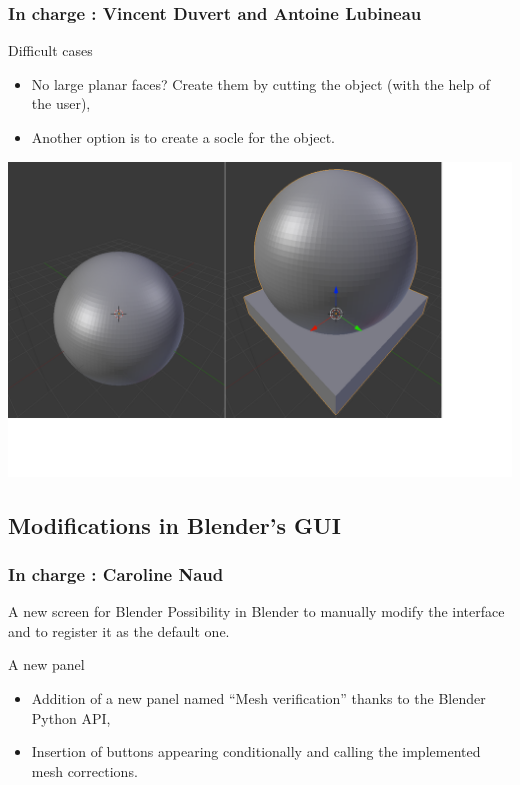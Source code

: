 \documentclass{beamer}
\begin{document}
\begin{frame}
	\frametitle{In charge : Vincent Duvert and Antoine Lubineau} 
	\begin{block}{Difficult cases}
		\begin{itemize}
			\item No large planar faces? Create them by cutting the object (with the help of the user),
			\item Another option is to create a socle for the object.
		\end{itemize}
    \end{block}

	\begin{center}
		\includegraphics[width=.7\textwidth]{pf_socle}
	\end{center}
    
\end{frame}

\subsection{Modifications in Blender's GUI}
\begin{frame}
	\frametitle{In charge : Caroline Naud}

    \begin{block}{A new screen for Blender}
Possibility in Blender to manually modify the interface and to register it as the default one.
    \end{block}
    
    \begin{block}{A new panel}
    \begin{itemize}
	\item Addition of a new panel named “Mesh verification” thanks to the Blender Python API,
	\item Insertion of buttons appearing conditionally and calling the implemented mesh corrections.
	\end{itemize}
    \end{block}
\end{frame}
\end{document}
